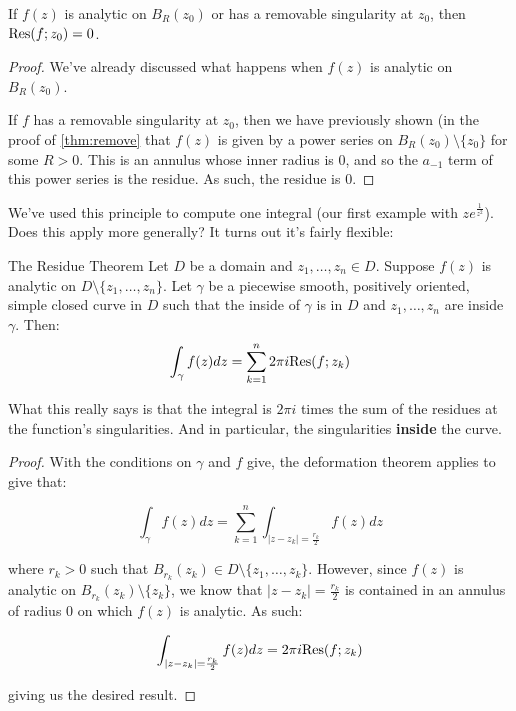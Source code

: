 \begin{thmbo}{}{} If $f(z)$ is analytic on $B_R(z_0)$ or has a removable singularity at $z_0$, then $\mathrm{Res}(f;z_0) = 0$.
\end{thmbo}

\begin{proof} We've already discussed what happens when $f(z)$ is analytic on $B_R(z_0)$.

If $f$ has a removable singularity at $z_0$, then we have previously shown (in the proof of \ref{thm:remove} that $f(z)$ is given by a power series on $B_R(z_0)\setminus\{z_0\}$ for some $R> 0$. This is an annulus whose inner radius is $0$, and so the $a_{-1}$ term of this power series is the residue. As such, the residue is $0$.
\end{proof}

We've used this principle to compute one integral (our first example with $ze^{\frac{1}{z^2}}$). Does this apply more generally? It turns out it's fairly flexible:

\begin{thmbo}{The Residue Theorem}{} Let $D$ be a domain and $z_1,\dots,z_n\in D$. Suppose $f(z)$ is analytic on $D\setminus \{z_1,\dots,z_n\}$. Let $\gamma$ be a piecewise smooth, positively oriented, simple closed curve in $D$ such that the inside of $\gamma$ is in $D$ and $z_1,\dots,z_n$ are inside $\gamma$. Then:
$$\int_{\gamma} f(z)dz = \sum_{k = 1}^n 2\pi i \mathrm{Res}(f;z_k)$$

\end{thmbo}

What this really says is that the integral is $2\pi i$ times the sum of the residues at the function's singularities. And in particular, the singularities {\bf inside} the curve.

\begin{proof} With the conditions on $\gamma$ and $f$ give, the deformation theorem applies to give that:

$$\int_{\gamma} f(z)dz = \sum_{k=1}^n \int_{|z-z_k| = \frac{r_k}{2}} f(z)dz$$

\noin where $r_k > 0$ such that $B_{r_k}(z_k)\in D\setminus\{z_1,\dots,z_k\}$. However, since $f(z)$ is analytic on $B_{r_k}(z_k)\setminus\{z_k\}$, we know that $|z-z_k| = \frac{r_k}{2}$ is contained in an annulus of radius $0$ on which $f(z)$ is analytic. As such:

$$\int_{|z-z_k| = \frac{r_k}{2}} f(z)dz = 2\pi i \mathrm{Res}(f;z_k)$$

\noin giving us the desired result.

\end{proof}

